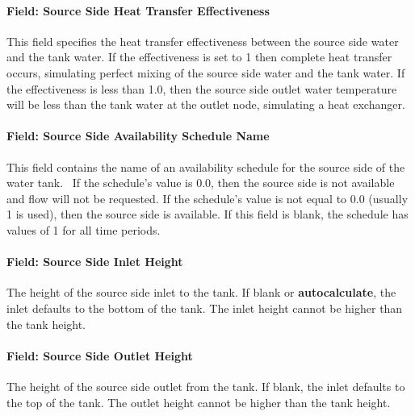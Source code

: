 \paragraph{Field: Source Side Heat Transfer
Effectiveness}\label{field-source-side-heat-transfer-effectiveness-thermalstoragehotwaterstratified}

This field specifies the heat transfer effectiveness between the source side
water and the tank water. If the effectiveness is set to 1 then complete heat
transfer occurs, simulating perfect mixing of the source side water and the tank
water. If the effectiveness is less than 1.0, then the source side outlet water
temperature will be less than the tank water at the outlet node, simulating a
heat exchanger.

\paragraph{Field: Source Side Availability Schedule
Name}\label{field-source-side-availability-schedule-name-thermalstoragehotwaterstratified}

This field contains the name of an availability schedule for the source side of
the water tank.~ If the schedule's value is 0.0, then the source side is not
available and flow will not be requested. If the schedule's value is not equal
to 0.0 (usually 1 is used), then the source side is available. If this field is
blank, the schedule has values of 1 for all time periods.

\paragraph{Field: Source Side Inlet
Height}\label{field-source-side-inlet-height-thermalstoragehotwaterstratified}

The height of the source side inlet to the tank. If blank or
\textbf{autocalculate}, the inlet defaults to the bottom of the tank. The inlet
height cannot be higher than the tank height.

\paragraph{Field: Source Side Outlet
Height}\label{field-source-side-outlet-height-thermalstoragehotwaterstratified}

The height of the source side outlet from the tank. If blank, the inlet defaults
to the top of the tank. The outlet height cannot be higher than the tank height.

